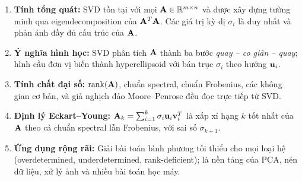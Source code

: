 \begin{enumerate}
    \item \textbf{Tính tổng quát:} SVD tồn tại với mọi $\mathbf{A} \in \mathbb{R}^{m \times n}$
          và được xây dựng tường minh qua eigendecomposition của $\mathbf{A}^T\mathbf{A}$.
          Các giá trị kỳ dị $\sigma_i$ là duy nhất và phản ánh đầy đủ cấu trúc của $\mathbf{A}$.

    \item \textbf{Ý nghĩa hình học:} SVD phân tích $\mathbf{A}$ thành ba bước
          \textit{quay -- co giãn -- quay}; hình cầu đơn vị biến thành hyperellipsoid
          với bán trục $\sigma_i$ theo hướng $\mathbf{u}_i$.

    \item \textbf{Tính chất đại số:} $\operatorname{rank}(\mathbf{A})$, chuẩn spectral, chuẩn Frobenius,
          các không gian cơ bản, và giả nghịch đảo Moore--Penrose đều đọc trực tiếp
          từ SVD.

    \item \textbf{Định lý Eckart--Young:} $\mathbf{A}_k = \sum_{i=1}^k\sigma_i\mathbf{u}_i\mathbf{v}_i^T$
          là xấp xỉ hạng $k$ tốt nhất của $\mathbf{A}$ theo cả chuẩn spectral lẫn
          Frobenius, với sai số $\sigma_{k+1}$.

    \item \textbf{Ứng dụng rộng rãi:} Giải bài toán bình phương tối thiểu cho mọi
          loại hệ (overdetermined, underdetermined, rank-deficient); là nền tảng của
          PCA, nén dữ liệu, xử lý ảnh và nhiều bài toán học máy.
\end{enumerate}


